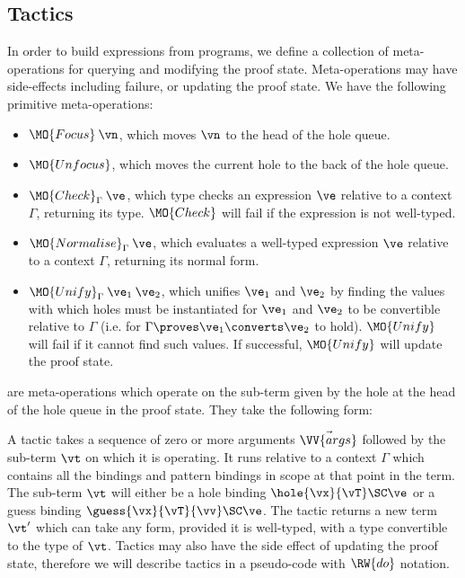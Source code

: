 \newcommand{\Check}{\MO{Check}_\Gamma}
\newcommand{\Eval}{\MO{Normalise}_\Gamma}
\newcommand{\Unify}{\MO{Unify}_\Gamma}

\subsection{Tactics}

In order to build \TT{} expressions from \Idris{} programs, we define a collection
of meta-operations for querying and modifying the proof state. Meta-operations
may have side-effects including failure, or updating the proof state. We have the following
primitive meta-operations:

\begin{itemize}
\item $\MO{Focus}\:\vn$, which moves $\vn$ to the head of the hole queue.
\item $\MO{Unfocus}$, which moves the current hole to the back of the hole queue.
\item $\Check\:\ve$, which type checks an expression $\ve$ relative to a context
$\Gamma$, returning its type.
$\MO{Check}$ will fail
if the expression is not well-typed.
\item $\Eval\:\ve$, which evaluates a well-typed expression $\ve$ relative to a context 
$\Gamma$, returning its normal form.
\item 
$\Unify\:\ve_1\:\ve_2$, 
which unifies $\ve_1$ and $\ve_2$ by finding the values with which holes must be instantiated
for $\ve_1$ and $\ve_2$ to be convertible relative to $\Gamma$
(i.e. for $\Gamma\proves\ve_1\converts\ve_2$ to hold). $\MO{Unify}$ will fail
if it cannot find such values. If successful, $\MO{Unify}$ will update the proof state.
\end{itemize}

 are meta-operations which operate on the sub-term given
by the hole at the head of the hole queue in the proof state. They take the following form:


A tactic takes a sequence of zero or more arguments $\vec{\VV{args}}$ followed
by the sub-term $\vt$ on which it is operating. It runs relative to a context
$\Gamma$ which contains all the bindings and pattern bindings in scope at that
point in the term. The sub-term $\vt$ will either be a hole binding
$\hole{\vx}{\vT}\SC\ve$ or a guess binding $\guess{\vx}{\vT}{\vv}\SC\ve$. The
tactic returns a new term $\vt'$ which can take any form, provided it is
well-typed, with a type convertible to the type of $\vt$. 
Tactics may also have the side effect of updating the proof state,
therefore we will describe tactics in a pseudo-code with $\RW{do}$ notation.

